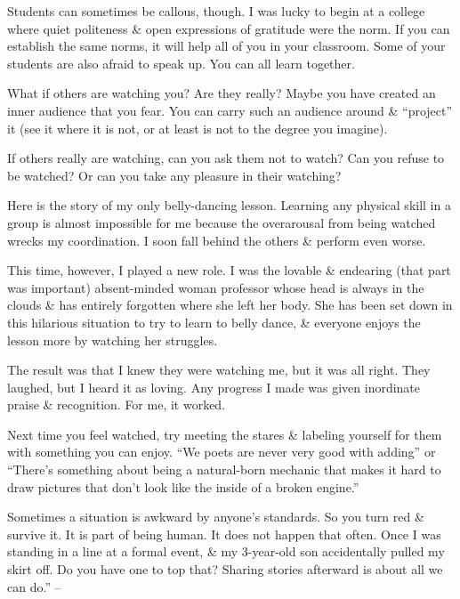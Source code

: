 \documentclass{article}
\numberwithin{equation}{section}
\begin{document}
Students can sometimes be callous, though. I was lucky to begin at a college where quiet politeness \& open expressions of gratitude were the norm. If you can establish the same norms, it will help all of you in your classroom. Some of your students are also afraid to speak up. You can all learn together.

What if others are watching you? Are they really? Maybe you have created an inner audience that you fear. You can carry such an audience around \& ``project'' it (see it where it is not, or at least is not to the degree you imagine).

If others really are watching, can you ask them not to watch? Can you refuse to be watched? Or can you take any pleasure in their watching?

Here is the story of my only belly-dancing lesson. Learning any physical skill in a group is almost impossible for me because the overarousal from being watched wrecks my coordination. I soon fall behind the others \& perform even worse.

This time, however, I played a new role. I was the lovable \& endearing (that part was important) absent-minded woman professor whose head is always in the clouds \& has entirely forgotten where she left her body. She has been set down in this hilarious situation to try to learn to belly dance, \& everyone enjoys the lesson more by watching her struggles.

The result was that I knew they were watching me, but it was all right. They laughed, but I heard it as loving. Any progress I made was given inordinate praise \& recognition. For me, it worked.

Next time you feel watched, try meeting the stares \& labeling yourself for them with something you can enjoy. ``We poets are never very good with adding'' or ``There's something about being a natural-born mechanic that makes it hard to draw pictures that don't look like the inside of a broken engine.''

Sometimes a situation is awkward by anyone's standards. So you turn red \& survive it. It is part of being human. It does not happen that often. Once I was standing in a line at a formal event, \& my 3-year-old son accidentally pulled my skirt off. Do you have one to top that? Sharing stories afterward is about all we can do.'' -- \cite[pp. 139--144]{Aron2013}
\end{document}
